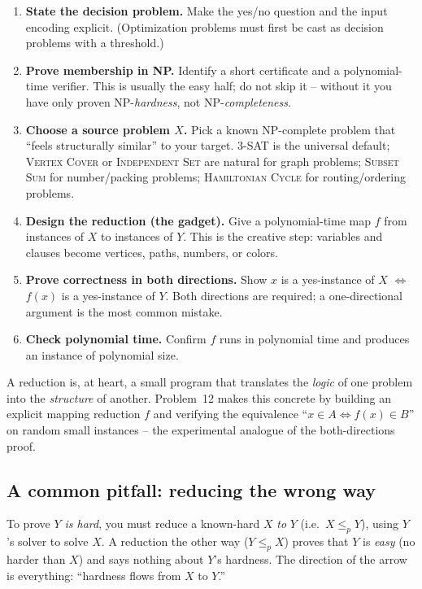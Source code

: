 \documentclass[11pt]{article}
\begin{document}
\begin{enumerate}
    \item \textbf{State the decision problem.} Make the yes/no question and the input
    encoding explicit. (Optimization problems must first be cast as decision problems with
    a threshold.)
    \item \textbf{Prove membership in NP.} Identify a short certificate and a
    polynomial-time verifier. This is usually the easy half; do not skip it -- without it
    you have only proven NP-\emph{hardness}, not NP-\emph{completeness}.
    \item \textbf{Choose a source problem $X$.} Pick a known NP-complete problem that
    ``feels structurally similar'' to your target. \textsc{3-SAT} is the universal default;
    \textsc{Vertex Cover} or \textsc{Independent Set} are natural for graph problems;
    \textsc{Subset Sum} for number/packing problems; \textsc{Hamiltonian Cycle} for
    routing/ordering problems.
    \item \textbf{Design the reduction (the gadget).} Give a polynomial-time map $f$ from
    instances of $X$ to instances of $Y$. This is the creative step: variables and clauses
    become vertices, paths, numbers, or colors.
    \item \textbf{Prove correctness in both directions.} Show $x$ is a yes-instance of $X$
    $\iff$ $f(x)$ is a yes-instance of $Y$. Both directions are required; a one-directional
    argument is the most common mistake.
    \item \textbf{Check polynomial time.} Confirm $f$ runs in polynomial time and produces
    an instance of polynomial size.
\end{enumerate}

A reduction is, at heart, a small program that translates the \emph{logic} of one problem
into the \emph{structure} of another. Problem~12 makes this concrete by building an explicit
mapping reduction $f$ and verifying the equivalence ``$x \in A \iff f(x) \in B$'' on random
small instances -- the experimental analogue of the both-directions proof.

\subsection{A common pitfall: reducing the wrong way}

To prove \emph{$Y$ is hard}, you must reduce a known-hard $X$ \emph{to} $Y$ (i.e.\ $X
\le_p Y$), using $Y$'s solver to solve $X$. A reduction the other way ($Y \le_p X$) proves
that $Y$ is \emph{easy} (no harder than $X$) and says nothing about $Y$'s hardness. The
direction of the arrow is everything: ``hardness flows from $X$ to $Y$.''
\end{document}
